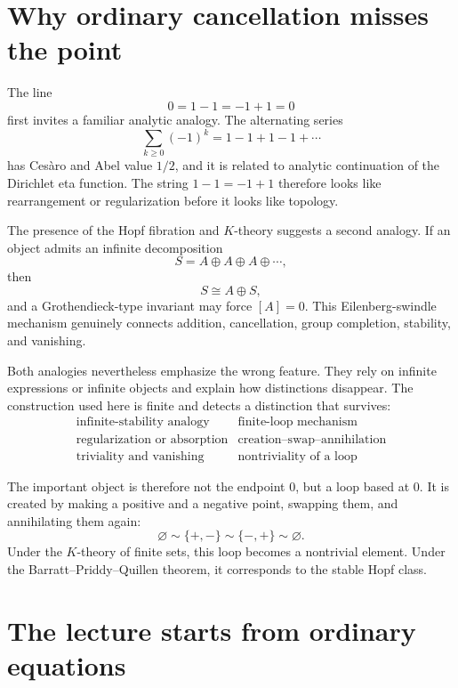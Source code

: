 
\section{Why ordinary cancellation misses the point}

The line
\[
  0=1-1=-1+1=0
\]
first invites a familiar analytic analogy.  The alternating series
\[
  \sum_{k\ge0}(-1)^k
  =
  1-1+1-1+\cdots
\]
has Ces\`aro and Abel value \(1/2\), and it is related to analytic continuation of the Dirichlet eta function.  The string \(1-1=-1+1\) therefore looks like rearrangement or regularization before it looks like topology.

The presence of the Hopf fibration and \(K\)-theory suggests a second analogy.  If an object admits an infinite decomposition
\[
  S=A\oplus A\oplus A\oplus\cdots,
\]
then
\[
  S\cong A\oplus S,
\]
and a Grothendieck-type invariant may force \([A]=0\).  This Eilenberg-swindle mechanism genuinely connects addition, cancellation, group completion, stability, and vanishing.

Both analogies nevertheless emphasize the wrong feature.  They rely on infinite expressions or infinite objects and explain how distinctions disappear.  The construction used here is finite and detects a distinction that survives:
\[
\begin{array}{c|c}
\text{infinite-stability analogy} & \text{finite-loop mechanism}\\
\hline
\text{regularization or absorption} & \text{creation--swap--annihilation}\\
\text{triviality and vanishing} & \text{nontriviality of a loop}
\end{array}
\]

The important object is therefore not the endpoint \(0\), but a loop based at \(0\).  It is created by making a positive and a negative point, swapping them, and annihilating them again:
\[
  \varnothing
  \sim
  \{+,-\}
  \sim
  \{-,+\}
  \sim
  \varnothing.
\]
Under the \(K\)-theory of finite sets, this loop becomes a nontrivial element.  Under the Barratt--Priddy--Quillen theorem, it corresponds to the stable Hopf class.

\section{The lecture starts from ordinary equations}

